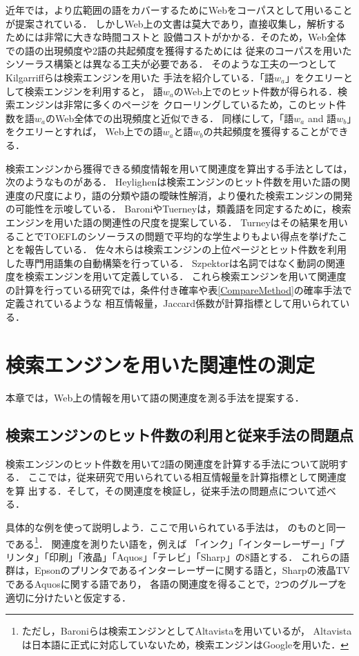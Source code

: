 \documentclass[japanese]{jnlp_1.3a}
\begin{document}
近年では，より広範囲の語をカバーするためにWebをコーパスとして用いることが提案されている．
しかしWeb上の文書は莫大であり，直接収集し，解析するためには非常に大きな時間コストと
設備コストがかかる．そのため，Web全体での語の出現頻度や2語の共起頻度を獲得するためには
従来のコーパスを用いたシソーラス構築とは異なる工夫が必要である．
そのような工夫の一つとしてKilgarriffらは検索エンジンを用いた
手法を紹介している\cite{Kilgarriff03}．「語$w_a$」をクエリーとして検索エンジンを利用すると，
語$w_a$のWeb上でのヒット件数が得られる．検索エンジンは非常に多くのページを
クローリングしているため，このヒット件数を語$w_a$のWeb全体での出現頻度と近似できる．
同様にして，「語$w_a$ and 語$w_b$」をクエリーとすれば，
Web上での語$w_a$と語$w_b$の共起頻度を獲得することができる．

検索エンジンから獲得できる頻度情報を用いて関連度を算出する手法としては，次のようなものがある．
Heylighenは検索エンジンのヒット件数を用いた語の関連度の尺度により，語の分類や語の曖昧性解消，より優れた検索エンジンの開発
の可能性を示唆している\cite{Heylighen01}．
BaroniやTuerneyは，類義語を同定するために，検索エンジンを用いた語の関連性の尺度を提案している\cite{Baroni04,Turney01}．
Turneyはその結果を用いることでTOEFLのシソーラスの問題で平均的な学生よりもよい得点を挙げたことを報告している．
佐々木らは検索エンジンの上位ページとヒット件数を利用した専門用語集の自動構築を行っている\cite{Sasaki05}．
Szpektorは名詞ではなく動詞の関連度を検索エンジンを用いて定義している\cite{Szpektor04}．
これら検索エンジンを用いて関連度の計算を行っている研究では，条件付き確率や表\ref{CompareMethod}の確率手法で定義されているような
相互情報量，Jaccard係数が計算指標として用いられている．


\section{検索エンジンを用いた関連性の測定}
  
本章では，Web上の情報を用いて語の関連度を測る手法を提案する．

\subsection{検索エンジンのヒット件数の利用と従来手法の問題点}

検索エンジンのヒット件数を用いて2語の関連度を計算する手法について説明す
る．
ここでは，従来研究で用いられている相互情報量を計算指標として関連度を算
出する．そして，その関連度を検証し，従来手法の問題点について述べる．


具体的な例を使って説明しよう．ここで用いられている手法は，
\cite{Baroni04}のものと同一である\footnote{ただし，Baroniらは検索エンジンとしてAltavistaを用いているが，
Altavistaは日本語に正式に対応していないため，検索エンジンはGoogleを用いた．}．
関連度を測りたい語を，例えば
「インク」「インターレーザー」「プリンタ」「印刷」「液晶」「Aquos」「テレビ」「Sharp」の8語とする．
これらの語群は，Epsonのプリンタであるインターレーザーに関する語と，Sharpの液晶TVであるAquosに関する語であり，
各語の関連度を得ることで，2つのグループを適切に分けたいと仮定する．
\end{document}
